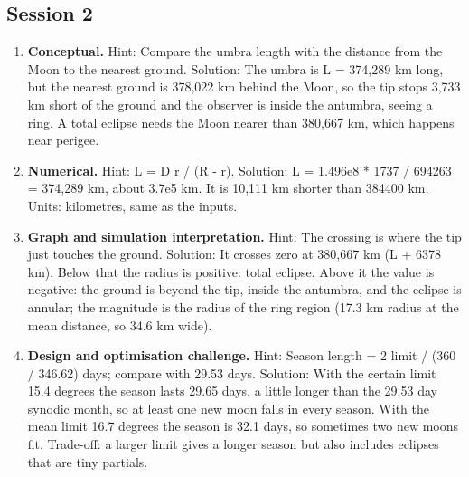 \documentclass[11pt,a4paper]{article}
\begin{document}
\subsection*{Session 2}
\begin{enumerate}[nosep]
\item \textbf{Conceptual.} Hint: Compare the umbra length with the distance from the Moon to the nearest ground. Solution: The umbra is L = 374,289 km long, but the nearest ground is 378,022 km behind the Moon, so the tip stops 3,733 km short of the ground and the observer is inside the antumbra, seeing a ring. A total eclipse needs the Moon nearer than 380,667 km, which happens near perigee.
\item \textbf{Numerical.} Hint: L = D r / (R - r). Solution: L = 1.496e8 * 1737 / 694263 = 374,289 km, about 3.7e5 km. It is 10,111 km shorter than 384400 km. Units: kilometres, same as the inputs.
\item \textbf{Graph and simulation interpretation.} Hint: The crossing is where the tip just touches the ground. Solution: It crosses zero at 380,667 km (L + 6378 km). Below that the radius is positive: total eclipse. Above it the value is negative: the ground is beyond the tip, inside the antumbra, and the eclipse is annular; the magnitude is the radius of the ring region (17.3 km radius at the mean distance, so 34.6 km wide).
\item \textbf{Design and optimisation challenge.} Hint: Season length = 2 limit / (360 / 346.62) days; compare with 29.53 days. Solution: With the certain limit 15.4 degrees the season lasts 29.65 days, a little longer than the 29.53 day synodic month, so at least one new moon falls in every season. With the mean limit 16.7 degrees the season is 32.1 days, so sometimes two new moons fit. Trade-off: a larger limit gives a longer season but also includes eclipses that are tiny partials.
\end{enumerate}
\end{document}

